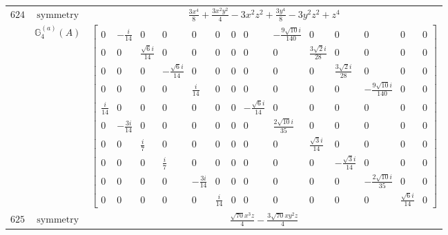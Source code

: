 \documentclass[fleqn,8pt,landscape]{jsarticle}
\begin{document}
\begin{longtable}{ccc}
$ 624 $ & $ \text{symmetry} $ & $ \frac{3 x^{4}}{8} + \frac{3 x^{2} y^{2}}{4} - 3 x^{2} z^{2} + \frac{3 y^{4}}{8} - 3 y^{2} z^{2} + z^{4} $ \\
$  $ & $ \mathbb{G}_{4}^{(a)}(A) $ & $ \begin{bmatrix} 0 & - \frac{i}{14} & 0 & 0 & 0 & 0 & 0 & 0 & - \frac{9 \sqrt{10} i}{140} & 0 & 0 & 0 & 0 & 0 \\ 0 & 0 & \frac{\sqrt{6} i}{14} & 0 & 0 & 0 & 0 & 0 & 0 & \frac{3 \sqrt{2} i}{28} & 0 & 0 & 0 & 0 \\ 0 & 0 & 0 & - \frac{\sqrt{6} i}{14} & 0 & 0 & 0 & 0 & 0 & 0 & \frac{3 \sqrt{2} i}{28} & 0 & 0 & 0 \\ 0 & 0 & 0 & 0 & \frac{i}{14} & 0 & 0 & 0 & 0 & 0 & 0 & - \frac{9 \sqrt{10} i}{140} & 0 & 0 \\ \frac{i}{14} & 0 & 0 & 0 & 0 & 0 & 0 & - \frac{\sqrt{6} i}{14} & 0 & 0 & 0 & 0 & 0 & 0 \\ 0 & - \frac{3 i}{14} & 0 & 0 & 0 & 0 & 0 & 0 & \frac{2 \sqrt{10} i}{35} & 0 & 0 & 0 & 0 & 0 \\ 0 & 0 & \frac{i}{7} & 0 & 0 & 0 & 0 & 0 & 0 & \frac{\sqrt{3} i}{14} & 0 & 0 & 0 & 0 \\ 0 & 0 & 0 & \frac{i}{7} & 0 & 0 & 0 & 0 & 0 & 0 & - \frac{\sqrt{3} i}{14} & 0 & 0 & 0 \\ 0 & 0 & 0 & 0 & - \frac{3 i}{14} & 0 & 0 & 0 & 0 & 0 & 0 & - \frac{2 \sqrt{10} i}{35} & 0 & 0 \\ 0 & 0 & 0 & 0 & 0 & \frac{i}{14} & 0 & 0 & 0 & 0 & 0 & 0 & \frac{\sqrt{6} i}{14} & 0 \end{bmatrix} $ \\ \hline
$ 625 $ & $ \text{symmetry} $ & $ \frac{\sqrt{70} x^{3} z}{4} - \frac{3 \sqrt{70} x y^{2} z}{4} $ \\

\end{longtable}
\end{document}

